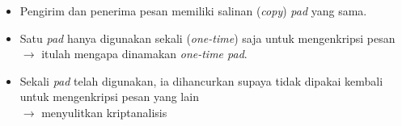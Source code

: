 \documentclass{article}
\begin{document}

\begin{itemize}
    \item Pengirim dan penerima pesan memiliki salinan (\textit{copy}) \textit{pad} yang sama.
    \item Satu \textit{pad} hanya digunakan sekali (\textit{one-time}) saja untuk mengenkripsi pesan\\
    $\rightarrow$ itulah mengapa dinamakan \textit{one-time pad}.
    \item Sekali \textit{pad} telah digunakan, ia dihancurkan supaya tidak dipakai kembali untuk mengenkripsi pesan yang lain\\
    $\rightarrow$ menyulitkan kriptanalisis
\end{itemize}
\end{document}
